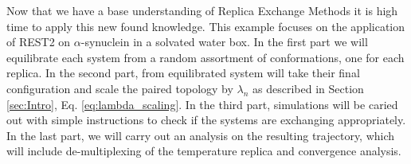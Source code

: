 Now that we have a base understanding of Replica Exchange Methods it is high time to apply this new found knowledge. 
This example focuses on the application of REST2 on $\alpha$-synuclein in a solvated water box.
In the first part we will equilibrate each system from a random assortment of conformations, one for each replica. 
In the second part, from equilibrated system will take their final configuration and scale the paired topology by $\lambda_n$ as described in Section \ref{sec:Intro}, Eq. \ref{eq:lambda_scaling}. In the third part, simulations will be caried out with simple instructions to check if the systems are exchanging appropriately. In the last part, we will carry out an analysis on the resulting trajectory, which will include de-multiplexing of the temperature replica and convergence analysis. 